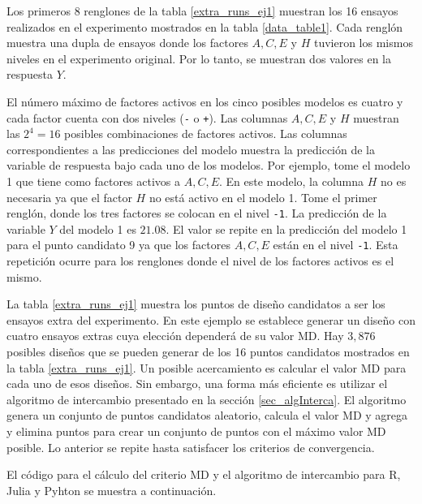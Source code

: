 Los primeros 8 renglones de la tabla \ref{extra_runs_ej1} muestran los 16 ensayos realizados en el experimento mostrados en la tabla \ref{data_table1}. Cada renglón muestra una dupla de ensayos donde los factores $A, C, E$ y $H$ tuvieron los mismos niveles en el experimento original. Por lo tanto, se muestran dos valores en la respuesta $Y$. 

El número máximo de factores activos en los cinco posibles modelos es cuatro y cada factor cuenta con dos niveles (\texttt{-} o \texttt{+}). Las columnas $A, C, E$ y $H$ muestran las $2^{4} = 16$ posibles combinaciones de factores activos. Las columnas correspondientes a las predicciones del modelo muestra la predicción de la variable de respuesta bajo cada uno de los modelos. Por ejemplo, tome el modelo 1 que tiene como factores activos a $A, C, E$. En este modelo, la columna $H$ no es necesaria ya que el factor $H$ no está activo en el modelo 1. Tome el primer renglón, donde los tres factores se colocan en el nivel \texttt{-1}. La predicción de la variable $Y$ del modelo 1 es $21.08$. El valor se repite en la predicción del modelo 1 para el punto candidato 9 ya que los factores $A, C, E$ están en el nivel \texttt{-1}. Esta repetición ocurre para los renglones donde el nivel de los factores activos es el mismo. 

La tabla \ref{extra_runs_ej1} muestra los puntos de diseño candidatos a ser los ensayos extra del experimento. En este ejemplo se establece generar un diseño con cuatro ensayos extras cuya elección dependerá de su valor MD. Hay $3,876$ posibles diseños que se pueden generar de los 16 puntos candidatos mostrados en la tabla \ref{extra_runs_ej1}. Un posible acercamiento es calcular el valor MD para cada uno de esos diseños. Sin embargo, una forma más eficiente es utilizar el algoritmo de intercambio presentado en la sección \ref{sec_algInterca}. El algoritmo genera un conjunto de puntos candidatos aleatorio, calcula el valor MD y agrega y elimina puntos para crear un conjunto de puntos con el máximo valor MD posible. Lo anterior se repite hasta satisfacer los criterios de convergencia. 

El código para el cálculo del criterio MD y el algoritmo de intercambio para \textsf{R, Julia} y \textsf{Pyhton} se muestra a continuación.

